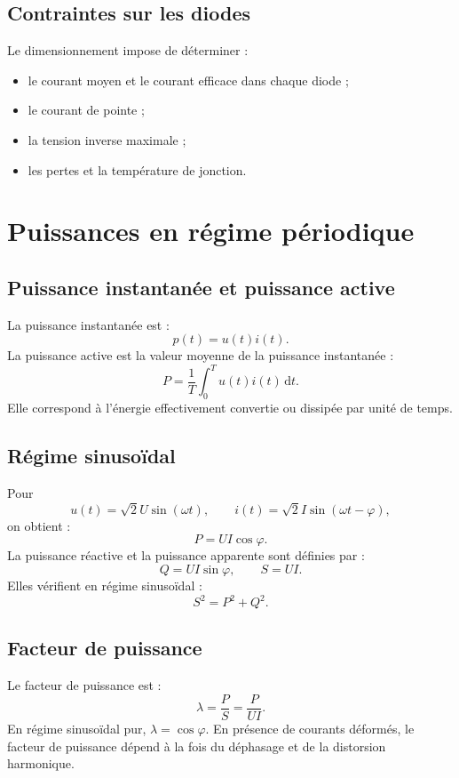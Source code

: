\subsection{Contraintes sur les diodes}

Le dimensionnement impose de déterminer :
\begin{itemize}
\item le courant moyen et le courant efficace dans chaque diode ;
\item le courant de pointe ;
\item la tension inverse maximale ;
\item les pertes et la température de jonction.
\end{itemize}

\section{Puissances en régime périodique}

\subsection{Puissance instantanée et puissance active}

La puissance instantanée est :
\[
p(t)=u(t)i(t).
\]
La puissance active est la valeur moyenne de la puissance instantanée :
\[
\boxed{P=\frac1T\int_0^T u(t)i(t)\,\mathrm dt}.
\]
Elle correspond à l'énergie effectivement convertie ou dissipée par unité de temps.

\subsection{Régime sinusoïdal}

Pour
\[
u(t)=\sqrt2U\sin(\omega t),
\qquad
i(t)=\sqrt2I\sin(\omega t-\varphi),
\]
on obtient :
\[
\boxed{P=UI\cos\varphi}.
\]
La puissance réactive et la puissance apparente sont définies par :
\[
\boxed{Q=UI\sin\varphi},
\qquad
\boxed{S=UI}.
\]
Elles vérifient en régime sinusoïdal :
\[
S^2=P^2+Q^2.
\]

\subsection{Facteur de puissance}

Le facteur de puissance est :
\[
\boxed{\lambda=\frac{P}{S}=\frac{P}{UI}}.
\]
En régime sinusoïdal pur, $\lambda=\cos\varphi$. En présence de courants déformés, le facteur de puissance dépend à la fois du déphasage et de la distorsion harmonique.

